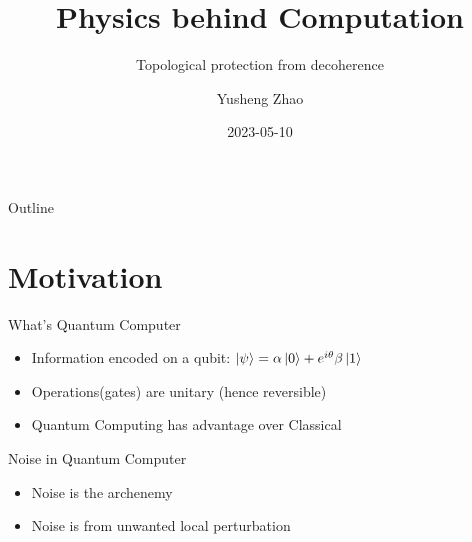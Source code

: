 \documentclass[presentation]{beamer}
\author{Yusheng Zhao}
\date{2023-05-10}
\title{Physics behind Computation}
\subtitle{Topological protection from decoherence}
\begin{document}
\maketitle
\begin{frame}{Outline}
\tableofcontents
\end{frame}


\section{Motivation}
\label{sec:org7a7ca73}
\begin{frame}[label={sec:org2a5cad1}]{What's Quantum Computer}
\begin{itemize}
\item Information encoded on a qubit: \(\ket{\psi} = \alpha \ket{0} + e^{i\theta}
  \beta \ket{1}\)
\item Operations(gates) are unitary (hence reversible)
\item Quantum Computing has advantage over Classical
\end{itemize}
\end{frame}


\begin{frame}[label={sec:org45cc246}]{Noise in Quantum Computer}
\begin{itemize}
\item Noise is the archenemy
\item Noise is from unwanted local perturbation
\end{itemize}
\end{frame}
\end{document}
